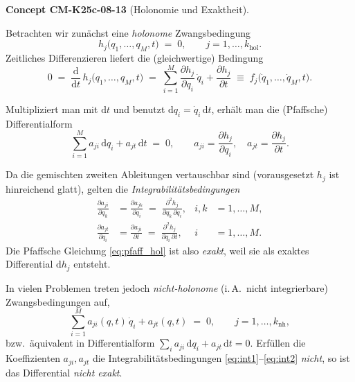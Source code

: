\documentclass[10pt, letterpaper]{article}
\newcommand{\CustomHeading}[3]{%
  \par\medskip\noindent%
  \textbf{#1 #2} \textnormal{(#3)}.\enskip%
}
\newenvironment{CONC}[2]{\CustomHeading{Concept}{#1}{#2}}{}
\begin{document}
\begin{CONC}{CM-K25c-08-13}{Holonomie und Exaktheit}
Betrachten wir zunächst eine \emph{holonome} Zwangsbedingung
\begin{equation}
  h_j\bigl(q_1,\dots,q_M,t\bigr)\;=\;0,
  \qquad j=1,\dots,k_{\mathrm{hol}} .
\end{equation}
Zeitliches Differenzieren liefert die (gleichwertige) Bedingung
\begin{equation}
  0 \;=\; \frac{\mathrm d}{\mathrm dt}\,
           h_j\bigl(q_1,\dots,q_M,t\bigr)
      \;=\;
      \sum_{i=1}^M 
        \frac{\partial h_j}{\partial q_i}\,\dot q_i
      + \frac{\partial h_j}{\partial t}
      \;\equiv\;
      f_j\bigl(\dot q_1,\dots,\dot q_M,t\bigr).
\end{equation}

Multipliziert man mit $\mathrm dt$ und benutzt
$\mathrm dq_i = \dot q_i\,\mathrm dt$, erhält man die (Pfaffsche) 
Differentialform
\begin{equation}\label{eq:pfaff_hol}
  \sum_{i=1}^{M} a_{ji}\,\mathrm dq_i
  + a_{jt}\,\mathrm dt \;=\; 0, \qquad
  a_{ji}=\frac{\partial h_j}{\partial q_i},\quad
  a_{jt}=\frac{\partial h_j}{\partial t}.
\end{equation}

Da die gemischten zweiten Ableitungen vertauschbar sind
(vorausgesetzt $h_j$ ist hinreichend glatt), gelten die
\emph{Integrabilitätsbedingungen}
\begin{align}
  \frac{\partial a_{ji}}{\partial q_k}
  &= \frac{\partial a_{jk}}{\partial q_i}
     \;=\;
     \frac{\partial^2 h_j}{\partial q_k\,\partial q_i},
     & i,k&=1,\dots,M,                                     \label{eq:int1}\\
  \frac{\partial a_{jt}}{\partial q_i}
  &= \frac{\partial a_{ji}}{\partial t}
     \;=\;
     \frac{\partial^2 h_j}{\partial q_i\,\partial t},
     & i&=1,\dots,M.                                       \label{eq:int2}
\end{align}
Die Pfaffsche Gleichung \eqref{eq:pfaff_hol} ist also \emph{exakt}, weil
sie als exaktes Differential $\mathrm d h_j$ entsteht.

In vielen Problemen treten jedoch \emph{nicht-holonome} (i.\,A.\, nicht
integrierbare) Zwangsbedingungen auf,
\begin{equation}\label{eq:pfaff_nh}
  \sum_{i=1}^{M} a_{ji}(q,t)\,\dot q_i
  + a_{jt}(q,t) \;=\; 0,
  \qquad j=1,\dots,k_{\mathrm{nh}},
\end{equation}
bzw.\ äquivalent in Differentialform
\(
  \sum_{i} a_{ji}\,\mathrm dq_i + a_{jt}\,\mathrm dt = 0 .
\)
Erfüllen die Koeffizienten $a_{ji},a_{jt}$ die
Integrabilitätsbedingungen \eqref{eq:int1}–\eqref{eq:int2} \emph{nicht},
so ist das Differential \emph{nicht exakt}.  


\end{CONC}
\end{document}
